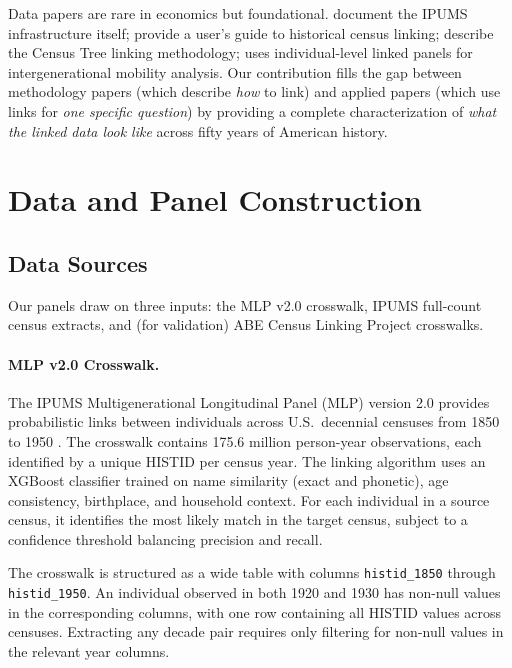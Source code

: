 \documentclass[12pt]{article}
\begin{document}
Data papers are rare in economics but foundational. \citet{ruggles2024} document the IPUMS infrastructure itself; \citet{abramitzky2021linking} provide a user's guide to historical census linking; \citet{price2019} describe the Census Tree linking methodology; \citet{feigenbaum2018} uses individual-level linked panels for intergenerational mobility analysis. Our contribution fills the gap between methodology papers (which describe \textit{how} to link) and applied papers (which use links for \textit{one specific question}) by providing a complete characterization of \textit{what the linked data look like} across fifty years of American history.



\section{Data and Panel Construction}\label{sec:data}

\subsection{Data Sources}

Our panels draw on three inputs: the MLP v2.0 crosswalk, IPUMS full-count census extracts, and (for validation) ABE Census Linking Project crosswalks.

\paragraph{MLP v2.0 Crosswalk.} The IPUMS Multigenerational Longitudinal Panel (MLP) version 2.0 provides probabilistic links between individuals across U.S.\ decennial censuses from 1850 to 1950 \citep{helgertz2023}. The crosswalk contains 175.6 million person-year observations, each identified by a unique HISTID per census year. The linking algorithm uses an XGBoost classifier trained on name similarity (exact and phonetic), age consistency, birthplace, and household context. For each individual in a source census, it identifies the most likely match in the target census, subject to a confidence threshold balancing precision and recall.

The crosswalk is structured as a wide table with columns \texttt{histid\_1850} through \texttt{histid\_\allowbreak{}1950}. An individual observed in both 1920 and 1930 has non-null values in the corresponding columns, with one row containing all HISTID values across censuses. Extracting any decade pair requires only filtering for non-null values in the relevant year columns.
\end{document}
